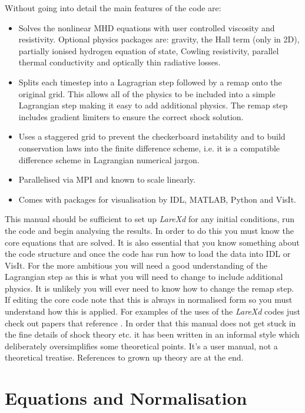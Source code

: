 \documentclass[11pt]{article}
\begin{document}
Without going into detail the main features of the code are:
\begin{itemize}
 \item Solves the nonlinear MHD equations with user controlled viscosity and resistivity. Optional 
 physics packages are: gravity, the Hall term (only in 2D), partially ionised hydrogen equation of state, 
 Cowling resistivity, parallel thermal conductivity and optically thin radiative losses.
 \item Splits each timestep into a Lagragrian step followed by a remap onto the original grid. This 
 allows all of the physics to be included into a simple Lagrangian step making it easy to add additional 
 physics. The remap step includes gradient limiters to ensure the correct shock solution.
 \item Uses a staggered grid to prevent the checkerboard instability and to build conservation laws 
 into the finite difference scheme, i.e. it is a compatible difference scheme in Lagrangian numerical jargon.
 \item Parallelised via MPI and known to scale linearly.
 \item Comes with packages for visualisation by IDL, MATLAB, Python and VisIt. \cite{visit}
\end{itemize}

This manual should be sufficient to set up {\it LareXd} for any initial conditions, run the code and 
begin analysing the results. In order to do this you must know the core equations that are solved. 
It is also essential that you know something about the code structure and once the code has run how 
to load the data into IDL or VisIt. For the more ambitious you will need a good understanding of the 
Lagrangian step as this is what you will need to change to include additional physics. It is unlikely 
you will ever need to know how to change the remap step. If editing the core code note that this is 
always in normalised form so you must understand how this is applied. For examples of the uses of the 
{\it LareXd} codes just check out papers that reference \cite{jcp}. In order that this manual does not 
get stuck in the fine details of shock theory etc. it has been written in an informal style which 
deliberately oversimplifies some theoretical points. It's a user manual, not a theoretical treatise. 
References to grown up theory are at the end.



\section{Equations and Normalisation}
\end{document}
